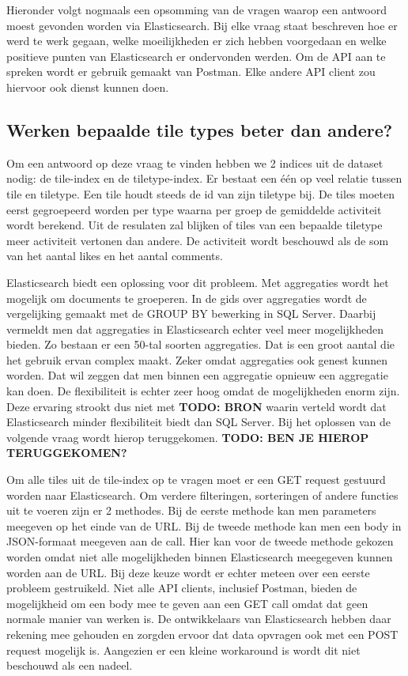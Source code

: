 Hieronder volgt nogmaals een opsomming van de vragen waarop een antwoord moest gevonden worden via Elasticsearch. Bij elke vraag staat beschreven hoe er werd te werk gegaan, welke moeilijkheden er zich hebben voorgedaan en welke positieve punten van Elasticsearch er ondervonden werden. Om de API aan te spreken wordt er gebruik gemaakt van Postman. Elke andere API client zou hiervoor ook dienst kunnen doen.

\subsection{Werken bepaalde tile types beter dan andere?}
Om een antwoord op deze vraag te vinden hebben we 2 indices uit de dataset nodig: de tile-index en de tiletype-index. Er bestaat een één op veel relatie tussen tile en tiletype. Een tile houdt steeds de id van zijn tiletype bij. De tiles moeten eerst gegroepeerd worden per type waarna per groep de gemiddelde activiteit wordt berekend. Uit de resulaten zal blijken of tiles van een bepaalde tiletype meer activiteit vertonen dan andere. De activiteit wordt beschouwd als de som van het aantal likes en het aantal comments.

Elasticsearch biedt een oplossing voor dit probleem. Met aggregaties wordt het mogelijk om documents te groeperen. In de gids over aggregaties wordt de vergelijking gemaakt met de GROUP BY bewerking in SQL Server. Daarbij vermeldt men dat aggregaties in Elasticsearch echter veel meer mogelijkheden bieden. Zo bestaan er een 50-tal soorten aggregaties. Dat is een groot aantal die het gebruik ervan complex maakt. Zeker omdat aggregaties ook genest kunnen worden. Dat wil zeggen dat men binnen een aggregatie opnieuw een aggregatie kan doen. De flexibiliteit is echter zeer hoog omdat de mogelijkheden enorm zijn. Deze ervaring strookt dus niet met \textbf{TODO: BRON} waarin verteld wordt dat Elasticsearch minder flexibiliteit biedt dan SQL Server. Bij het oplossen van de volgende vraag wordt hierop teruggekomen. \textbf{TODO: BEN JE HIEROP TERUGGEKOMEN?}

Om alle tiles uit de tile-index op te vragen moet er een GET request gestuurd worden naar Elasticsearch. Om verdere filteringen, sorteringen of andere functies uit te voeren zijn er 2 methodes. Bij de eerste methode kan men parameters meegeven op het einde van de URL. Bij de tweede methode kan men een body in JSON-formaat meegeven aan de call. Hier kan voor de tweede methode gekozen worden omdat niet alle mogelijkheden binnen Elasticsearch meegegeven kunnen worden aan de URL. Bij deze keuze wordt er echter meteen over een eerste probleem gestruikeld. Niet alle API clients, inclusief Postman, bieden de mogelijkheid om een body mee te geven aan een GET call omdat dat geen normale manier van werken is. De ontwikkelaars van Elasticsearch hebben daar rekening mee gehouden en zorgden ervoor dat data opvragen ook met een POST request mogelijk is. Aangezien er een kleine workaround is wordt dit niet beschouwd als een nadeel.

